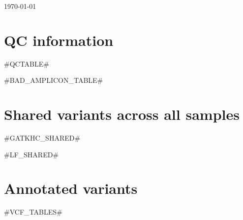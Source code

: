\documentclass[11pt, a4paper, landscape]{article}
\newcommand{\lightfont}{\fontseries{l}\selectfont}
\renewcommand{\arraystretch}{1.5}
\begin{document}
\noindent
{\fontsize{16pt}{16pt}\selectfont {}}

\medskip
\noindent
{\lightfont \today}

%
\section{QC information}

\footnotesize
{{#QCTABLE#}}


\normalsize
{{#BAD_AMPLICON_TABLE#}}

\newpage
\section{Shared variants across all samples}

{{#GATKHC_SHARED#}}

{{#LF_SHARED#}}

\newpage
\renewcommand{\arraystretch}{1.4}
\section{Annotated variants}
\footnotesize
{{#VCF_TABLES#}}

%
%
%
%
%

\end{document}
